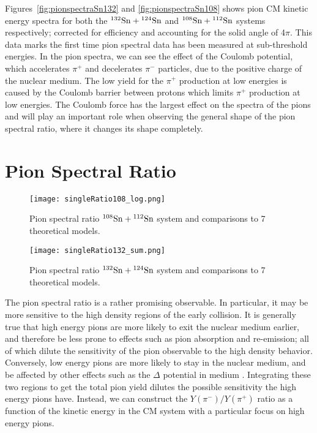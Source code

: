 Figures~\ref{fig:pionspectraSn132} and \ref{fig:pionspectraSn108} shows pion CM kinetic energy spectra for both the ${}^{132}\mathrm{Sn} + {}^{124}\mathrm{Sn}$ and ${}^{108}\mathrm{Sn} + {}^{112}\mathrm{Sn}$ systems respectively; corrected for efficiency and accounting for the solid angle of 4$\pi$. This data marks the first time pion spectral data has been measured at sub-threshold energies. In the pion spectra, we can see the effect of the Coulomb potential, which accelerates $\pi^+$ and decelerates $\pi^-$ particles, due to the positive charge of the nuclear medium. The low yield for the $\pi^+$ production at low energies is caused by the Coulomb barrier between protons which limits $\pi^+$ production at low energies. The Coulomb force has the largest effect on the spectra of the pions and will play an important role when observing the general shape of the pion spectral ratio, where it changes its shape completely. 



\section{Pion Spectral Ratio}

\begin{figure}[!htb]
\centering
\texttt{[image: singleRatio108\_log.png]}
\caption{Pion spectral ratio ${}^{108}\mathrm{Sn} + {}^{112}\mathrm{Sn}$ system and comparisons to 7 theoretical models.}
\label{fig:SRsn108}
\end{figure}

\begin{figure}[!htb]
\centering
\texttt{[image: singleRatio132\_sum.png]}
\caption{Pion spectral ratio ${}^{132}\mathrm{Sn} + {}^{124}\mathrm{Sn}$ system and comparisons to 7 theoretical models.}
\label{fig:SRsn132}
\end{figure}

The pion spectral ratio is a rather promising observable. In particular, it may be more sensitive to the high density regions of the early collision. It is generally true that high energy pions are more likely to exit the nuclear medium  earlier, and therefore be less prone to effects such as pion absorption and re-emission; all of which dilute the sensitivity of the pion observable to the high density behavior. Conversely, low energy pions are more likely to stay in the nuclear medium, and be affected by other effects such as the $\Delta$ potential in medium \cite{baoan_deltapotential}. Integrating these two regions to get the total pion yield dilutes the possible sensitivity the high energy pions have. Instead, we can construct the $Y(\pi^-)/Y(\pi^+)$ ratio as a function of the kinetic energy in the CM system with a particular focus on high energy pions.

